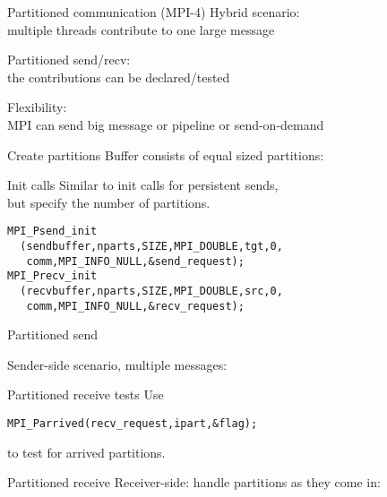 
\begin{numberedframe}{Partitioned communication (MPI-4)}
  Hybrid scenario:\\
  multiple threads contribute to one large message

  Partitioned send/recv:\\
  the contributions can be declared/tested

  Flexibility:\\
  MPI can send big message or pipeline or send-on-demand
\end{numberedframe}

\begin{numberedframe}{Create partitions}
  Buffer consists of equal sized partitions:
  
\end{numberedframe}

\begin{numberedframe}{Init calls}
  Similar to init calls for persistent sends,\\
  but specify the number of partitions.
\begin{lstlisting}
MPI_Psend_init
  (sendbuffer,nparts,SIZE,MPI_DOUBLE,tgt,0,
   comm,MPI_INFO_NULL,&send_request);
MPI_Precv_init
  (recvbuffer,nparts,SIZE,MPI_DOUBLE,src,0,
   comm,MPI_INFO_NULL,&recv_request);
\end{lstlisting}
\end{numberedframe}

\begin{numberedframe}{Partitioned send}

  Sender-side scenario, multiple messages:
  
\end{numberedframe}

\begin{numberedframe}{Partitioned receive tests}
Use 
\begin{lstlisting}
MPI_Parrived(recv_request,ipart,&flag);
\end{lstlisting}
to test for arrived partitions.
\end{numberedframe}

\begin{numberedframe}{Partitioned receive}
  Receiver-side: handle partitions as they come in:

\end{numberedframe}
